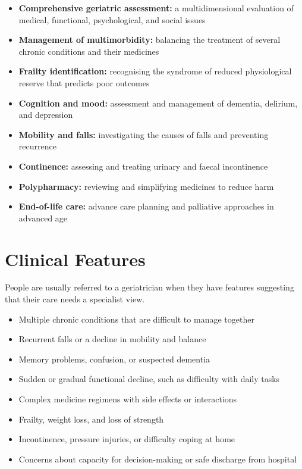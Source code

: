\begin{itemize}
    \item \textbf{Comprehensive geriatric assessment:} a multidimensional evaluation of medical, functional, psychological, and social issues
    \item \textbf{Management of multimorbidity:} balancing the treatment of several chronic conditions and their medicines
    \item \textbf{Frailty identification:} recognising the syndrome of reduced physiological reserve that predicts poor outcomes
    \item \textbf{Cognition and mood:} assessment and management of dementia, delirium, and depression
    \item \textbf{Mobility and falls:} investigating the causes of falls and preventing recurrence
    \item \textbf{Continence:} assessing and treating urinary and faecal incontinence
    \item \textbf{Polypharmacy:} reviewing and simplifying medicines to reduce harm
    \item \textbf{End-of-life care:} advance care planning and palliative approaches in advanced age
\end{itemize}

\section*{Clinical Features}
People are usually referred to a geriatrician when they have features suggesting that their care needs a specialist view.

\begin{itemize}
    \item Multiple chronic conditions that are difficult to manage together
    \item Recurrent falls or a decline in mobility and balance
    \item Memory problems, confusion, or suspected dementia
    \item Sudden or gradual functional decline, such as difficulty with daily tasks
    \item Complex medicine regimens with side effects or interactions
    \item Frailty, weight loss, and loss of strength
    \item Incontinence, pressure injuries, or difficulty coping at home
    \item Concerns about capacity for decision-making or safe discharge from hospital
\end{itemize}

